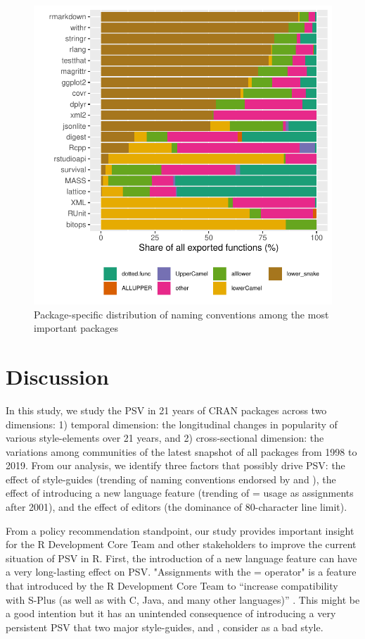 \begin{figure}[htbp]
  \centering
  \includegraphics{fig7}
  \caption{Package-specific distribution of naming conventions among the most important packages}
  \label{figure:fig7}
\end{figure}

\section{Discussion}

In this study, we study the PSV in 21 years of CRAN packages across two dimensions: 1) temporal dimension: the longitudinal changes in popularity of various style-elements over 21 years, and 2) cross-sectional dimension: the variations among communities of the latest snapshot of all packages from 1998 to 2019. From our analysis, we identify three factors that possibly drive PSV: the effect of style-guides (trending of naming conventions endorsed by \citet{tidyverse} and \citet{google}), the effect of introducing a new language feature (trending of = usage as assignments after 2001), and the effect of editors (the dominance of 80-character line limit).

From a policy recommendation standpoint, our study provides important insight for the R Development Core Team and other stakeholders to improve the current situation of PSV in R. First, the introduction of a new language feature can have a very long-lasting effect on PSV. "Assignments with the = operator" is a feature that introduced by the R Development Core Team to ``increase compatibility with S-Plus (as well as with C, Java, and many other languages)'' \citep{chambers}. This might be a good intention but it has an unintended consequence of introducing a very persistent PSV that two major style-guides, \citet{tidyverse} and \citet{google}, consider as a bad style.

